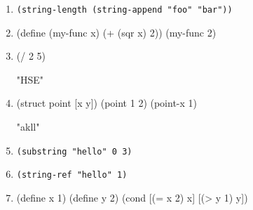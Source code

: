 \documentclass[11pt]{article}
\newcommand{\prog}[1]{\texttt{#1}}
\begin{document}
\begin{enumerate}[label=(\alph*)]
\item \prog{(string-length (string-append "foo" "bar"))}

\else
 \vspace{12mm}
\fi


\item
\begin{program}
  (define (my-func x) (+ (sqr x) 2))
  (my-func 2)
\end{program}
\else
 \vspace{12mm}
\fi

\item 

\begin{program}
 (/ 2 5)
\end{program}

\sol
\begin{program}
"HSE"
\end{program}
\else
 \vspace{12mm}
\fi

\item

\begin{program}
  (struct point [x y])
  (point 1 2)
  (point-x 1)
\end{program}

\sol
\begin{program}
"akll"
\end{program}
\else
 \vspace{12mm}
\fi


\item \prog{(substring "hello" 0 3)}

\sol
\begin{program}
\end{program}
\else
 \vspace{12mm}
\fi

\item \prog{(string-ref "hello" 1)}

\sol
\begin{program}
\end{program}
\else
 \vspace{12mm}
\fi

\item
  \begin{program}
    (define x 1)
    (define y 2)
    (cond
      [(= x 2) x]
      [(> y 1) y])
  \end{program}


\end{enumerate}
\end{document}
